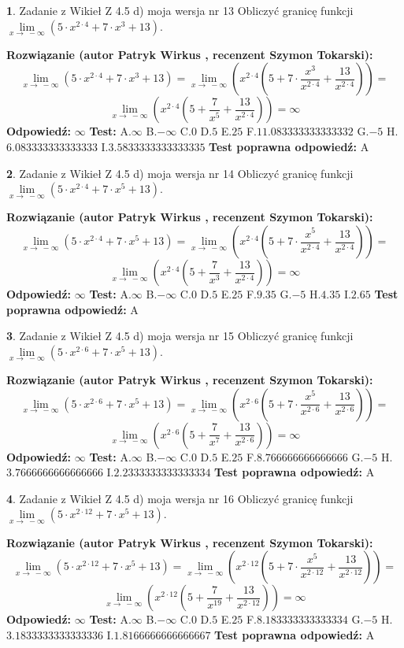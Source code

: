\documentclass[12pt, a4paper]{article}
\theoremstyle{definition} %
\newtheorem{zad}{}
\newcommand{\zadStart}[1]{\begin{zad}#1\newline}
\newcommand{\zadStop}{\end{zad}}
\newcommand{\rozwStart}[2]{\noindent \textbf{Rozwiązanie (autor #1 , recenzent #2): }\newline}
\newcommand{\rozwStop}{\newline}
\newcommand{\odpStart}{\noindent \textbf{Odpowiedź:}\newline}
\newcommand{\odpStop}{\newline}
\newcommand{\testStart}{\noindent \textbf{Test:}\newline}
\newcommand{\testStop}{\newline}
\newcommand{\kluczStart}{\noindent \textbf{Test poprawna odpowiedź:}\newline}
\newcommand{\kluczStop}{\newline}
\begin{document}
\zadStart{Zadanie z Wikieł Z 4.5 d) moja wersja nr 13}
Obliczyć granicę funkcji  $\lim\limits_{x\to\ -\infty}(5 \cdot x^{2\cdot4}+7 \cdot x^{3}+13)$.
\zadStop
\rozwStart{Patryk Wirkus}{Szymon Tokarski}
$$\lim\limits_{x\to\ -\infty}(5 \cdot x^{2\cdot4}+7 \cdot x^{3}+13) = \lim\limits_{x\to\ -\infty}(x^{2\cdot4}(5 +7 \cdot \frac{x^{3}}{x^{2\cdot4}}+\frac{13}{x^{2\cdot4}})) =$$ $$\lim\limits_{x\to\ -\infty}(x^{2\cdot4}(5 +\frac{7}{x^{5}}+\frac{13}{x^{2\cdot4}})) =\infty$$
\rozwStop
\odpStart
$\infty$
\odpStop
\testStart
A.$\infty$ B.$-\infty$ C.$0$ D.$5$ E.$25$
F.$11.083333333333332$ G.$-5$
H.$6.083333333333333$
I.$3.5833333333333335$
\testStop
\kluczStart
A
\kluczStop



\zadStart{Zadanie z Wikieł Z 4.5 d) moja wersja nr 14}
Obliczyć granicę funkcji  $\lim\limits_{x\to\ -\infty}(5 \cdot x^{2\cdot4}+7 \cdot x^{5}+13)$.
\zadStop
\rozwStart{Patryk Wirkus}{Szymon Tokarski}
$$\lim\limits_{x\to\ -\infty}(5 \cdot x^{2\cdot4}+7 \cdot x^{5}+13) = \lim\limits_{x\to\ -\infty}(x^{2\cdot4}(5 +7 \cdot \frac{x^{5}}{x^{2\cdot4}}+\frac{13}{x^{2\cdot4}})) =$$ $$\lim\limits_{x\to\ -\infty}(x^{2\cdot4}(5 +\frac{7}{x^{3}}+\frac{13}{x^{2\cdot4}})) =\infty$$
\rozwStop
\odpStart
$\infty$
\odpStop
\testStart
A.$\infty$ B.$-\infty$ C.$0$ D.$5$ E.$25$
F.$9.35$ G.$-5$
H.$4.35$
I.$2.65$
\testStop
\kluczStart
A
\kluczStop



\zadStart{Zadanie z Wikieł Z 4.5 d) moja wersja nr 15}
Obliczyć granicę funkcji  $\lim\limits_{x\to\ -\infty}(5 \cdot x^{2\cdot6}+7 \cdot x^{5}+13)$.
\zadStop
\rozwStart{Patryk Wirkus}{Szymon Tokarski}
$$\lim\limits_{x\to\ -\infty}(5 \cdot x^{2\cdot6}+7 \cdot x^{5}+13) = \lim\limits_{x\to\ -\infty}(x^{2\cdot6}(5 +7 \cdot \frac{x^{5}}{x^{2\cdot6}}+\frac{13}{x^{2\cdot6}})) =$$ $$\lim\limits_{x\to\ -\infty}(x^{2\cdot6}(5 +\frac{7}{x^{7}}+\frac{13}{x^{2\cdot6}})) =\infty$$
\rozwStop
\odpStart
$\infty$
\odpStop
\testStart
A.$\infty$ B.$-\infty$ C.$0$ D.$5$ E.$25$
F.$8.766666666666666$ G.$-5$
H.$3.7666666666666666$
I.$2.2333333333333334$
\testStop
\kluczStart
A
\kluczStop



\zadStart{Zadanie z Wikieł Z 4.5 d) moja wersja nr 16}
Obliczyć granicę funkcji  $\lim\limits_{x\to\ -\infty}(5 \cdot x^{2\cdot12}+7 \cdot x^{5}+13)$.
\zadStop
\rozwStart{Patryk Wirkus}{Szymon Tokarski}
$$\lim\limits_{x\to\ -\infty}(5 \cdot x^{2\cdot12}+7 \cdot x^{5}+13) = \lim\limits_{x\to\ -\infty}(x^{2\cdot12}(5 +7 \cdot \frac{x^{5}}{x^{2\cdot12}}+\frac{13}{x^{2\cdot12}})) =$$ $$\lim\limits_{x\to\ -\infty}(x^{2\cdot12}(5 +\frac{7}{x^{19}}+\frac{13}{x^{2\cdot12}})) =\infty$$
\rozwStop
\odpStart
$\infty$
\odpStop
\testStart
A.$\infty$ B.$-\infty$ C.$0$ D.$5$ E.$25$
F.$8.183333333333334$ G.$-5$
H.$3.1833333333333336$
I.$1.8166666666666667$
\testStop
\kluczStart
A
\kluczStop
\end{document}
